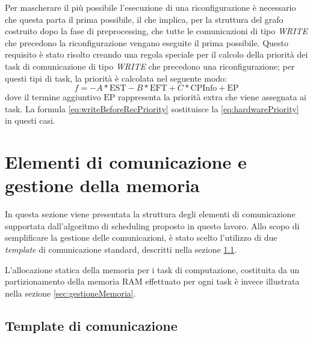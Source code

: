 Per mascherare il più possibile l'esecuzione di una riconfigurazione è 
necessario che questa parta il prima possibile, il che implica, per la 
struttura del grafo costruito dopo la fase di preprocessing, che tutte le 
comunicazioni di tipo \emph{WRITE} che precedono la riconfigurazione vengano 
eseguite il prima possibile. Questo requisito è stato risolto creando una 
regola speciale per il calcolo della priorità dei task di comunicazione di tipo 
\emph{WRITE} che precedono una riconfigurazione; per questi tipi di task, la 
priorità è calcolata nel seguente modo:
\begin{equation} \label{eq:writeBeforeRecPriority}
  f=-A*\text{EST} - B*\text{EFT} + C*\text{CPInfo} + \text{EP}
\end{equation}
dove il termine aggiuntivo $\text{EP}$ rappresenta la priorità extra che viene 
assegnata ai task. La formula \ref{eq:writeBeforeRecPriority} sostituisce la 
\ref{eq:hardwarePriority} in questi casi.



\section{Elementi di comunicazione e gestione della memoria}
\label{sec:elementiComunicazioneGestioneMemoria}
In questa sezione viene presentata la struttura degli elementi di comunicazione 
supportata dall'algoritmo di scheduling proposto in questo lavoro.
Allo scopo di semplificare la gestione delle comunicazioni, è stato scelto 
l'utilizzo di due \emph{template} di comunicazione standard, descritti nella 
sezione \ref{sec:templateComunicazione}.

L'allocazione statica della memoria per i task di computazione, costituita da 
un partizionamento della memoria \acs{RAM} effettuato per ogni task è invece 
illustrata nella sezione \ref{sec:gestioneMemoria}.


\subsection{Template di comunicazione}
\label{sec:templateComunicazione}

